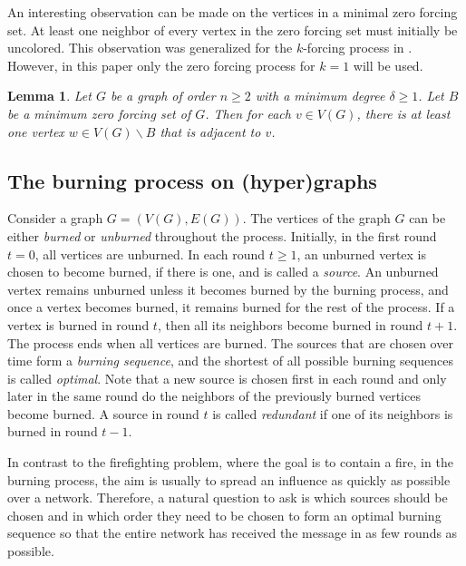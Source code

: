 \documentclass[12pt]{article}
\theoremstyle{plain}
\newtheorem{lemma}[theorem]{Lemma}
\theoremstyle{definition}
\newtheorem{definition}[theorem]{Definition}
\theoremstyle{remark}
\begin{document}
An interesting observation can be made on the vertices in a minimal zero forcing set. At least one neighbor of every vertex in the zero forcing set must initially be uncolored.
This observation was generalized for the $k$-forcing process in \cite{k-forcing-upper}. However, in this paper only the zero forcing process for $k=1$ will be used.

\begin{lemma}{\cite{k-forcing-upper}}
    Let $G$ be a graph of order $n\geq 2$ with a minimum degree $\delta\geq 1$. Let $B$ be a minimum zero forcing set of $G$. Then for each $v\in V(G)$, there is at least one vertex $w\in V(G)\backslash B$ that is adjacent to $v$.
    \label{lemma:zfp-neighbor-uncolored}
\end{lemma}
 


\subsection{The burning process on (hyper)graphs}


   Consider a graph $G=(V(G),E(G))$. The vertices of the graph $G$ can be either \textit{burned} or \textit{unburned} throughout the process. Initially, in the first round $t=0$, all vertices are unburned. In each round $t\geq 1$, an unburned vertex is chosen to become burned, if there is one, and is called a \textit{source}. An unburned vertex remains unburned unless it becomes burned by the burning process, and once a vertex becomes burned, it remains burned for the rest of the process. If a vertex is burned in round $t$, then all its neighbors become burned in round $t+1$. 
    The process ends when all vertices are burned. 
    The sources that are chosen over time form a \textit{burning sequence}, and the shortest of all possible burning sequences is called \textit{optimal}.
    Note that a new source is chosen first in each round and only later in the same round do the neighbors of the previously burned vertices become burned.
    A source in round $t$ is called \textit{redundant} if one of its neighbors is burned in round $t-1$. 


In contrast to the firefighting problem, where the goal is to contain a fire, in the burning process, the aim is usually to spread an influence as quickly as possible over a network.
Therefore, a natural question to ask is which sources should be chosen and in which order they need to be chosen to form an optimal burning sequence so that the entire network has received the message in as few rounds as possible.
\end{document}
